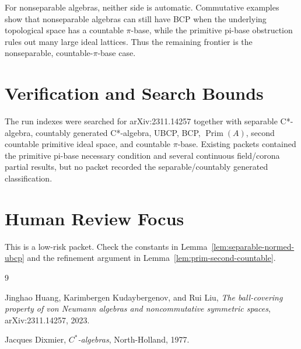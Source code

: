 \documentclass[11pt]{article}
\newcommand{\Prim}{\operatorname{Prim}}
\begin{document}
For nonseparable algebras, neither side is automatic.  Commutative examples
show that nonseparable algebras can still have BCP when the underlying
topological space has a countable \(\pi\)-base, while the primitive pi-base
obstruction rules out many large ideal lattices.  Thus the remaining frontier
is the nonseparable, countable-\(\pi\)-base case.

\section*{Verification and Search Bounds}

The run indexes were searched for arXiv:2311.14257 together with separable
C*-algebra, countably generated C*-algebra, UBCP, BCP, \(\Prim(A)\), second
countable primitive ideal space, and countable \(\pi\)-base.  Existing packets
contained the primitive pi-base necessary condition and several continuous
field/corona partial results, but no packet recorded the separable/countably
generated classification.

\section*{Human Review Focus}

This is a low-risk packet.  Check the constants in
Lemma~\ref{lem:separable-normed-ubcp} and the refinement argument in
Lemma~\ref{lem:prim-second-countable}.

\begin{thebibliography}{9}

Jinghao Huang, Karimbergen Kudaybergenov, and Rui Liu,
\emph{The ball-covering property of von Neumann algebras and noncommutative
symmetric spaces},
arXiv:2311.14257, 2023.

Jacques Dixmier,
\emph{\(C^*\)-algebras},
North-Holland, 1977.

\end{thebibliography}
\end{document}
